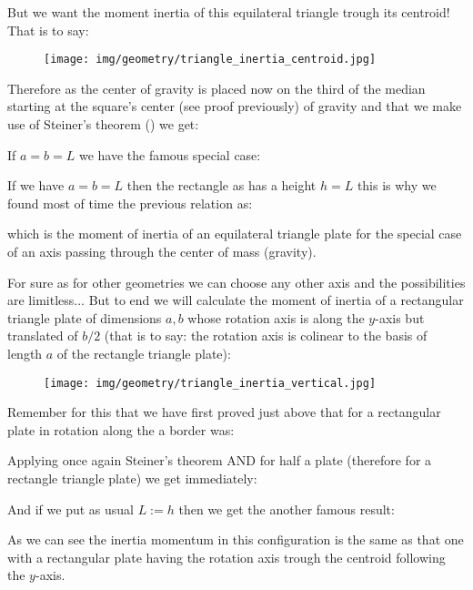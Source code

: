 {	But we want the moment inertia of this equilateral triangle trough its centroid! That is to say:
	\begin{figure}[H]
		\centering
		\texttt{[image: img/geometry/triangle\_inertia\_centroid.jpg]}
	\end{figure}
	Therefore as the center of gravity is placed now on the third of the median starting at the square's center (see proof previously) of gravity and that we make use of Steiner's theorem () we get:
	
	If $a=b=L$ we have the famous special case:
	
	If we have $a=b=L$ then the rectangle as has a height $h=L$ this is why we found most of time the previous relation as:
	
	which is the moment of inertia of an equilateral triangle plate for the special case of an axis passing through the center of mass (gravity).
	
	For sure as for other geometries we can choose any other axis and the possibilities are limitless... But to end we will calculate the moment of inertia of a rectangular triangle plate of dimensions $a,b$ whose rotation axis is along the $y$-axis but translated of $b/2$ (that is to say: the rotation axis is colinear to the basis of length $a$ of the rectangle triangle plate):
	\begin{figure}[H]
		\centering
		\texttt{[image: img/geometry/triangle\_inertia\_vertical.jpg]}
	\end{figure}
	Remember for this that we have first proved just above that for a rectangular plate in rotation along the a border was:
	
	Applying once again Steiner's theorem AND for half a plate (therefore for a rectangle triangle plate) we get immediately:
	
	And if we put as usual $L:=h$ then we get the another famous result:
	
	As we can see the inertia momentum in this configuration is the same as that one with a rectangular plate having the rotation axis trough the centroid following the $y$-axis.
	
}
